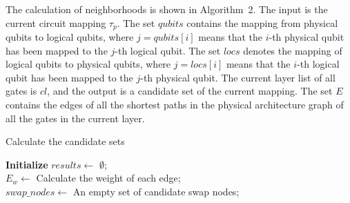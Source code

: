 \documentclass[journal]{IEEEtran}
\begin{document}
	The calculation of neighborhoods is shown in Algorithm~2. %
	The input is the current circuit mapping $\tau_{p}$. The set $qubits$ contains the mapping from physical qubits to logical qubits, where $ j = qubits [i] $ means that the $i$-th physical qubit has been mapped to the $j$-th logical qubit. The set $ locs $ denotes the mapping of logical qubits to physical qubits, where $ j = locs [i] $ means that the $i$-th logical qubit has been mapped to the $j$-th physical qubit.
	The current layer list of all gates is $cl$, and the output is a candidate set of the current mapping. The set $E$ contains the edges of all the shortest paths in the physical architecture graph of all the gates in the current layer. 
	\begin{algorithm} [htbp]
		\caption{Calculate the candidate sets }  
		\LinesNumbered  
		\textbf{Initialize}  $results \leftarrow$ $\emptyset$;\\
		$E_{w} \leftarrow$ Calculate the weight of each edge;\\
		$swap\_nodes \leftarrow $ An empty set of candidate swap nodes;\\  
		
		

\end{algorithm}
\end{document}
